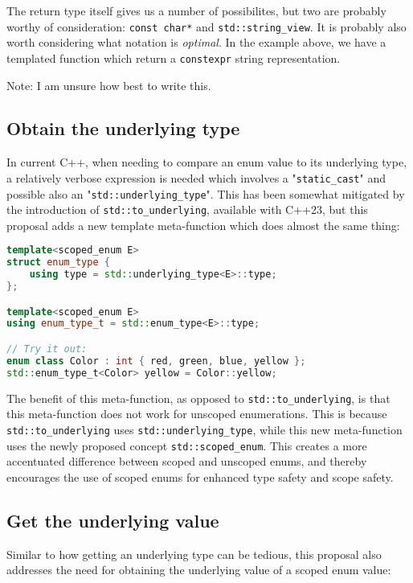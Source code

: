 \documentclass[
  format=manuscript,
  screen=true,
  review=false,
  nonacm=true,
  timestamp=true,
  balance=false]{acmart}
\begin{document}
\noindent
The return type itself gives us a number of possibilites, but two are probably worthy
of consideration: \texttt{const char*} and \texttt{std::string\_view}. It is probably
also worth considering what notation is \textit{optimal}. In the example above, we
have a templated function which return a \texttt{constexpr} string representation.

\vspace{2mm}\noindent
Note: I am unsure how best to write this.


\subsection{Obtain the underlying type}

In current C++, when needing to compare an enum value to its underlying type,
a relatively verbose expression is needed which involves a "\texttt{static\_cast}"
and possible also an "\texttt{std::underlying\_type}". This has been somewhat
mitigated by the introduction of \texttt{std::to\_underlying}, available with C++23,
but this proposal adds a new template meta-function which does almost the same
thing:\vspace{2mm}

\begin{lstlisting}[language=Cpp]
template<scoped_enum E>
struct enum_type {
    using type = std::underlying_type<E>::type;
};

template<scoped_enum E>
using enum_type_t = std::enum_type<E>::type;

// Try it out:
enum class Color : int { red, green, blue, yellow };
std::enum_type_t<Color> yellow = Color::yellow;
\end{lstlisting}

The benefit of this meta-function, as opposed to \texttt{std::to\_underlying}, is
that this meta-function does not work for unscoped enumerations. This is because
\texttt{std::to\_underlying} uses \texttt{std::underlying\_type}, while this new
meta-function uses the newly proposed concept \texttt{std::scoped\_enum}.
This creates a more accentuated difference between scoped and unscoped enums, and
thereby encourages the use of scoped enums for enhanced type safety and scope
safety.


\subsection{Get the underlying value}

Similar to how getting an underlying type can be tedious, this proposal also
addresses the need for obtaining the underlying value of a scoped enum value:\vspace{2mm}
\end{document}
